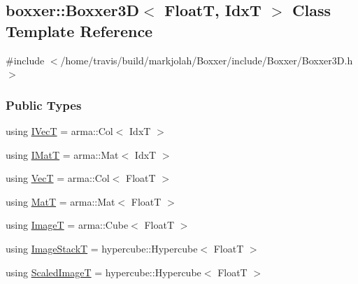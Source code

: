 \hypertarget{classboxxer_1_1Boxxer3D}{}\subsection{boxxer\+:\+:Boxxer3D$<$ FloatT, IdxT $>$ Class Template Reference}
\label{classboxxer_1_1Boxxer3D}


{\ttfamily \#include $<$/home/travis/build/markjolah/\+Boxxer/include/\+Boxxer/\+Boxxer3\+D.\+h$>$}

\subsubsection*{Public Types}
\begin{DoxyCompactItemize}
\item 
using \hyperlink{classboxxer_1_1Boxxer3D_a62a7f35aa283e2a833d13edaa228bca2}{I\+VecT} = arma\+::\+Col$<$ IdxT $>$
\item 
using \hyperlink{classboxxer_1_1Boxxer3D_a9b8cb89e1f1fbf091e5443876ca9a200}{I\+MatT} = arma\+::\+Mat$<$ IdxT $>$
\item 
using \hyperlink{classboxxer_1_1Boxxer3D_a74e56a85bc18204a802bbf2a76eea61c}{VecT} = arma\+::\+Col$<$ FloatT $>$
\item 
using \hyperlink{classboxxer_1_1Boxxer3D_ae155080a591506ca84d3d70f1cde337d}{MatT} = arma\+::\+Mat$<$ FloatT $>$
\item 
using \hyperlink{classboxxer_1_1Boxxer3D_a8990923b1207fc8ae066de124ab75053}{ImageT} = arma\+::\+Cube$<$ FloatT $>$
\item 
using \hyperlink{classboxxer_1_1Boxxer3D_aa17e25866089479e9b40ea01dfad8a88}{Image\+StackT} = hypercube\+::\+Hypercube$<$ FloatT $>$
\item 
using \hyperlink{classboxxer_1_1Boxxer3D_aefd3895d7a0790a08de4714ee7a59d97}{Scaled\+ImageT} = hypercube\+::\+Hypercube$<$ FloatT $>$
\end{DoxyCompactItemize}
